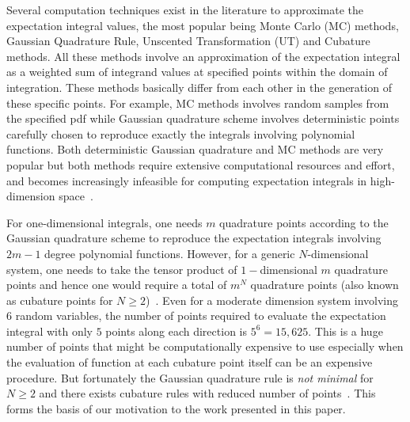 \documentclass[letterpaper, 10 pt, conference]{IEEEtran}  %
\begin{document}
Several computation techniques exist in the literature to approximate the expectation integral values, the most popular being Monte Carlo (MC) methods, Gaussian Quadrature Rule, Unscented Transformation (UT) and Cubature methods. All these methods involve an approximation of the expectation integral as a weighted sum of integrand values at specified points within the domain of integration. These methods basically differ from each other in the generation of these specific points. For example, MC methods involves random samples from the specified pdf while Gaussian quadrature scheme involves deterministic points carefully chosen to reproduce exactly the integrals involving polynomial functions. Both deterministic Gaussian quadrature and MC methods are very popular but both methods require extensive computational resources and effort, and becomes increasingly infeasible for computing expectation integrals in high-dimension space~\cite{strGQF}. 

For one-dimensional integrals, one needs $m$ quadrature points according to the Gaussian quadrature scheme to reproduce the expectation integrals involving $2m-1$ degree polynomial functions. However, for a generic $N$-dimensional system, one needs to take the tensor product of $1-$dimensional $m$ quadrature points and hence one would require a total of $m^N$ quadrature points (also known as cubature points for $N\ge2$)~\cite{strGQF}.  Even for a moderate dimension system involving $6$ random variables, the number of points required to evaluate the expectation integral with only $5$ points along each direction is $5^6=15,625$. This is a huge number of points that might be computationally expensive to use especially when the evaluation of function at each cubature point itself can be an expensive procedure.%
But fortunately the Gaussian quadrature rule is \emph{not minimal} for $N\ge2$ and there exists cubature rules with reduced number of points~\cite{strGQF}. This forms the basis of our motivation to the work presented in this paper.
\end{document}
